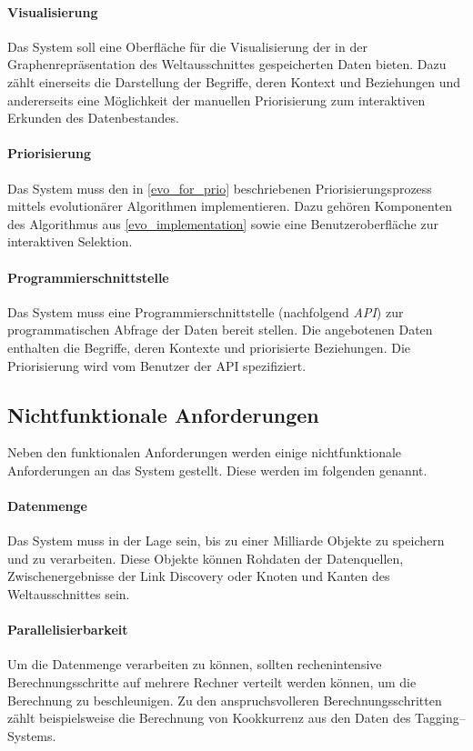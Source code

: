 \paragraph{Visualisierung} Das System soll eine Oberfläche für die Visualisierung der in der Graphenrepräsentation des Weltausschnittes gespeicherten Daten bieten. Dazu zählt einerseits die Darstellung der Begriffe, deren Kontext und Beziehungen und andererseits eine Möglichkeit der manuellen Priorisierung zum interaktiven Erkunden des Datenbestandes.

\paragraph{Priorisierung} Das System muss den in \cref{evo_for_prio} beschriebenen Priorisierungsprozess mittels evolutionärer Algorithmen implementieren. Dazu gehören Komponenten des Algorithmus aus \cref{evo_implementation} sowie eine Benutzeroberfläche zur interaktiven Selektion.

\paragraph{Programmierschnittstelle} Das System muss eine Programmierschnittstelle (nachfolgend \emph{API}) zur programmatischen Abfrage der Daten bereit stellen. Die angebotenen Daten enthalten die Begriffe, deren Kontexte und priorisierte Beziehungen. Die Priorisierung wird vom Benutzer der API spezifiziert.

\subsection{Nichtfunktionale Anforderungen}

Neben den funktionalen Anforderungen werden einige nichtfunktionale Anforderungen an das System gestellt. Diese werden im folgenden genannt.

\paragraph{Datenmenge} Das System muss in der Lage sein, bis zu einer Milliarde Objekte zu speichern und zu verarbeiten. Diese Objekte können Rohdaten der Datenquellen, Zwischenergebnisse der Link Discovery oder Knoten und Kanten des Weltausschnittes sein.

\paragraph{Parallelisierbarkeit} Um die Datenmenge verarbeiten zu können, sollten rechenintensive Berechnungsschritte auf mehrere Rechner verteilt werden können, um die Berechnung zu beschleunigen. Zu den anspruchsvolleren Berechnungsschritten zählt beispielsweise die Berechnung von Kookkurrenz aus den Daten des Tagging--Systems.

